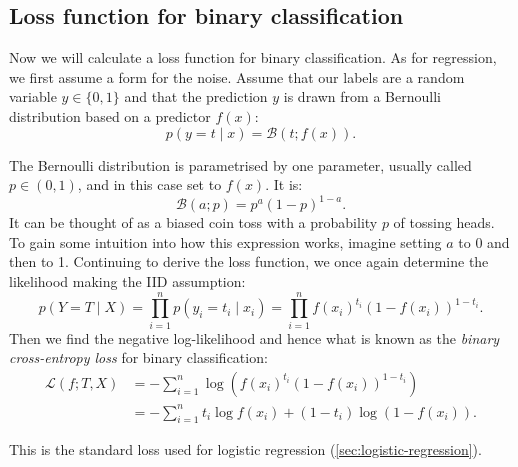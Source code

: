 \documentclass[11pt, a4paper]{book}
\newcommand{\defn}[1]{\emph{#1}}
\begin{document}
        \subsection{Loss function for binary classification}
        \label{sec:loss-classification}

            Now we will calculate a loss function for binary classification. As for regression, we first assume a form for the noise. Assume that our labels are a random variable $y \in \{0, 1\}$ and that the prediction $y$ is drawn from a Bernoulli distribution based on a predictor $f(x)$:
            \begin{equation}
                p(y = t \mid x) = \mathcal B(t; f(x)).
            \end{equation}

            The Bernoulli distribution is parametrised by one parameter, usually called $p \in (0, 1)$, and in this case set to $f(x)$. It is:
            \begin{equation}
                \mathcal B(a; p) = p^a(1 - p)^{1 - a}.
            \end{equation}
            It can be thought of as a biased coin toss with a probability $p$ of tossing heads. To gain some intuition into how this expression works, imagine setting $a$ to 0 and then to 1. Continuing to derive the loss function, we once again determine the likelihood making the IID assumption:
            \begin{equation}
                p(Y = T \mid X) = \prod_{i = 1}^n p(y_i = t_i \mid x_i) = \prod_{i = 1}^n f(x_i)^{t_i}(1 - f(x_i))^{1 - {t_i}}.
            \end{equation}
            Then we find the negative log-likelihood and hence what is known as the \defn{binary cross-entropy loss} for binary classification:
            \begin{align}
                \mathcal L(f; T, X) &= -\sum_{i = 1}^n \log \left(f(x_i)^{t_i}(1 - f(x_i))^{1 - {t_i}}\right)\\
                    &= -\sum_{i = 1}^n t_i \log f(x_i) + (1 - t_i) \log (1 - f(x_i)).
            \end{align}

            This is the standard loss used for logistic regression (\autoref{sec:logistic-regression}).

\end{document}
